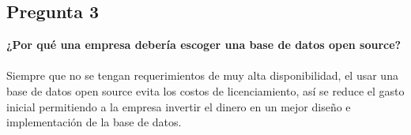 \subsection*{Pregunta 3}
\textbf{¿Por qué una empresa debería escoger una base de datos open source?}\\ \\
Siempre que no se tengan requerimientos de muy alta disponibilidad, el usar una base de datos open source evita los costos de licenciamiento, así se reduce el gasto inicial permitiendo a la empresa invertir el dinero en un mejor diseño e implementación de la base de datos.
\newpage
